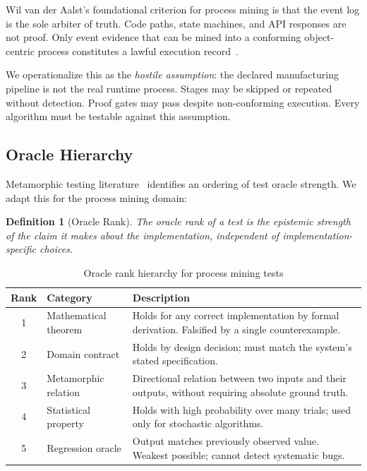 \documentclass[12pt,a4paper]{article}
\newtheorem{definition}{Definition}
\begin{document}
Wil van der Aalst's foundational criterion for process mining is that the event
log is the sole arbiter of truth. Code paths, state machines, and API responses
are not proof. Only event evidence that can be mined into a conforming
object-centric process constitutes a lawful execution record~\cite{vda2016}.

We operationalize this as the \emph{hostile assumption}: the declared
manufacturing pipeline is not the real runtime process. Stages may be skipped or
repeated without detection. Proof gates may pass despite non-conforming execution.
Every algorithm must be testable against this assumption.

\subsection{Oracle Hierarchy}

Metamorphic testing literature~\cite{chen2018} identifies an ordering of test
oracle strength. We adapt this for the process mining domain:

\begin{definition}[Oracle Rank]
  The oracle rank of a test is the epistemic strength of the claim it makes about
  the implementation, independent of implementation-specific choices.
\end{definition}

\begin{table}[H]
  \centering
  \caption{Oracle rank hierarchy for process mining tests}
  \label{tab:oracle-ranks}
  \begin{tabular}{clp{8cm}}
    \toprule
    \textbf{Rank} & \textbf{Category} & \textbf{Description} \\
    \midrule
    1 & Mathematical theorem & Holds for any correct implementation by formal
      derivation. Falsified by a single counterexample. \\
    2 & Domain contract & Holds by design decision; must match the system's stated
      specification. \\
    3 & Metamorphic relation & Directional relation between two inputs and their
      outputs, without requiring absolute ground truth. \\
    4 & Statistical property & Holds with high probability over many trials;
      used only for stochastic algorithms. \\
    5 & Regression oracle & Output matches previously observed value. Weakest
      possible; cannot detect systematic bugs. \\
    \bottomrule
  \end{tabular}
\end{table}
\end{document}
